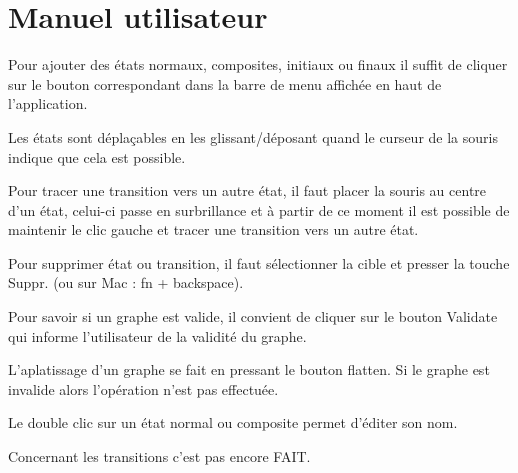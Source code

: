 \section{Manuel utilisateur}

\newpage

Pour ajouter des états normaux, composites, initiaux ou finaux il suffit de cliquer sur le bouton correspondant dans la barre de menu affichée en haut de l'application.


Les états sont déplaçables en les glissant/déposant quand le curseur de la souris indique que cela est possible.

Pour tracer une transition vers un autre état, il faut placer la souris au centre d'un état, celui-ci passe en surbrillance et à partir de ce moment il est possible de maintenir le clic gauche et tracer une transition vers un autre état.

Pour supprimer état ou transition, il faut sélectionner la cible et presser la touche Suppr. (ou sur Mac : fn + backspace).

Pour savoir si un graphe est valide, il convient de cliquer sur le bouton Validate qui informe l'utilisateur de la validité du graphe.

L'aplatissage d'un graphe se fait en pressant le bouton flatten. Si le graphe est invalide alors l'opération n'est pas effectuée.

Le double clic sur un état normal ou composite permet d'éditer son nom.

Concernant les transitions c'est pas encore FAIT.